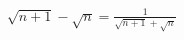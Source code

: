 \documentclass[preview]{standalone}
\begin{document}
\begin{align*}
\sqrt{n+1} - \sqrt{n} = \frac{1}{ \sqrt{n+1} + \sqrt{n} }
\end{align*}
\end{document}
